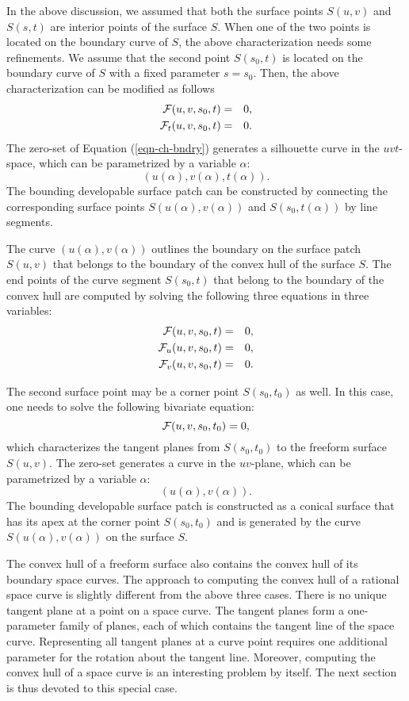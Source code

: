 \documentclass{elsart}
\begin{document}
In the above discussion, we assumed that both the surface points
$S(u,v)$ and $S(s,t)$ are interior points of the surface $S$.
When one of the two points is located on the boundary curve of $S$,
the above characterization needs some refinements.
We assume that the second point $S(s_0,t)$ is located
on the boundary curve of $S$ with a fixed parameter $s=s_0$.
Then, the above characterization can be modified as follows
\begin{eqnarray}
   {\cal F}(u,v,s_0,t) &=& 0, \label{eqn-ch-bndry}\\
   {\cal F}_t(u,v,s_0,t) &=& 0. \nonumber
\end{eqnarray}
The zero-set of Equation (\ref{eqn-ch-bndry}) generates a silhouette curve 
in the $uvt$-space, which can be parametrized by a variable $\alpha$:
\[
   (u(\alpha),v(\alpha),t(\alpha)).
\]
The bounding developable surface patch can be constructed
by connecting the corresponding surface points
$S(u(\alpha),v(\alpha))$ and $S(s_0,t(\alpha))$ by line segments.

The curve $(u(\alpha),v(\alpha))$ outlines the boundary
on the surface patch $S(u,v)$ that belongs to the boundary of
the convex hull of the surface $S$.  The end points of
the curve segment $S(s_0,t)$ that belong to the boundary
of the convex hull are computed by solving the following
three equations in three variables:
\begin{eqnarray*}
   {\cal F}(u,v,s_0,t) &=& 0,\\
   {\cal F}_u(u,v,s_0,t) &=& 0,\\
   {\cal F}_v(u,v,s_0,t) &=& 0.
\end{eqnarray*}

The second surface point may be a corner point $S(s_0,t_0)$ as well.
In this case, one needs to solve the following bivariate equation:
\[
   {\cal F}(u,v,s_0,t_0) = 0,
\]
which characterizes the tangent planes from $S(s_0,t_0)$
to the freeform surface $S(u,v)$.
The zero-set generates a curve in the $uv$-plane,
which can be parametrized by a variable $\alpha$:
\[
   (u(\alpha),v(\alpha)).
\]
The bounding developable surface patch is constructed
as a conical surface that has its apex at the corner point
$S(s_0,t_0)$ and is generated by the curve
$S(u(\alpha),v(\alpha))$ on the surface $S$.

The convex hull of a freeform surface also contains
the convex hull of its boundary space curves.
The approach to computing the convex hull of a rational space curve
is slightly different from the above three cases.
There is no unique tangent plane at a point on a space curve.
The tangent planes form a one-parameter family of planes,
each of which contains the tangent line of the space curve.
Representing all tangent planes at a curve point requires
one additional parameter for the rotation about the tangent line.
Moreover, computing the convex hull of a space curve is 
an interesting problem by itself.
The next section is thus devoted to this special case.
\end{document}
